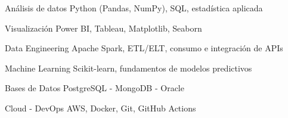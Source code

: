 


\begin{cvskills}


\cvskill
{Análisis de datos} %
{Python (Pandas, NumPy), SQL, estadística aplicada} %


\cvskill
{Visualización} %
{Power BI, Tableau, Matplotlib, Seaborn } %


\cvskill
{Data Engineering} %
{Apache Spark, ETL/ELT, consumo e integración de APIs} %


\cvskill
{Machine Learning} %
{Scikit-learn, fundamentos de modelos predictivos} %


\cvskill
{Bases de Datos} %
{PostgreSQL - MongoDB - Oracle} %


\cvskill
{Cloud - DevOps} %
{AWS, Docker, Git, GitHub Actions} %




\end{cvskills}
